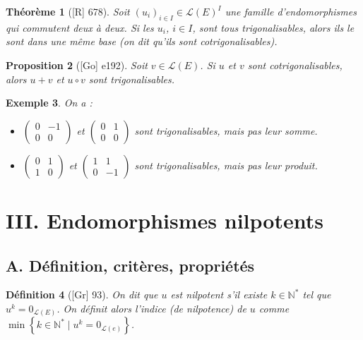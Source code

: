 \documentclass[10pt, a4paper, parskip=full, twoside, twocolumn]{report}
\newtheorem{definition}{Définition}
\newtheorem{theorem}[definition]{Théorème}
\newtheorem{proposition}[definition]{Proposition}
\newtheorem{example}[definition]{Exemple}
\newcommand{\IN}{\mathbb{N}}
\begin{document}
\begin{theorem}[\textnormal{[R] 678}]
	Soit $\left(u_i\right)_{i\in I}\in\mathcal{L}(E)^I$ une famille d'endomorphismes qui commutent deux à deux. Si les $u_i$, $i\in I$, sont tous trigonalisables, alors ils le sont dans une même base (on dit qu'ils sont \emph{cotrigonalisables}).
\end{theorem}

\begin{proposition}[\textnormal{[Go] e192}]
	Soit $v\in\mathcal{L}(E)$. Si $u$ et $v$ sont cotrigonalisables, alors $u+v$ et $u\circ v$ sont trigonalisables.
\end{proposition}

\begin{example}
	On a :
	\begin{itemize}
		\item $\left(\begin{smallmatrix}
			0& -1\\ 0 & 0
		\end{smallmatrix}\right)$ et $\left(\begin{smallmatrix}
			0& 1\\ 0 & 0
		\end{smallmatrix}\right)$ sont trigonalisables, mais pas leur somme.
		\item $\left(\begin{smallmatrix}
			0& 1\\ 1 & 0
		\end{smallmatrix}\right)$ et $\left(\begin{smallmatrix}
			1 & 1\\ 0 & -1
		\end{smallmatrix}\right)$ sont trigonalisables, mais pas leur produit.
	\end{itemize}
\end{example}

\section*{III. Endomorphismes nilpotents}
\subsection*{A. Définition, critères, propriétés}

\begin{definition}[\textnormal{[Gr] 93}]
	On dit que $u$ est \emph{nilpotent} s'il existe $k\in\IN^*$ tel que $u^k=0_{\mathcal{L}(E)}$.
	On définit alors \emph{l'indice (de nilpotence) de $u$} comme $\min\left\{k\in\IN^*\mid u^k = 0_{\mathcal{L}(e)}\right\}$.
\end{definition}
\end{document}
